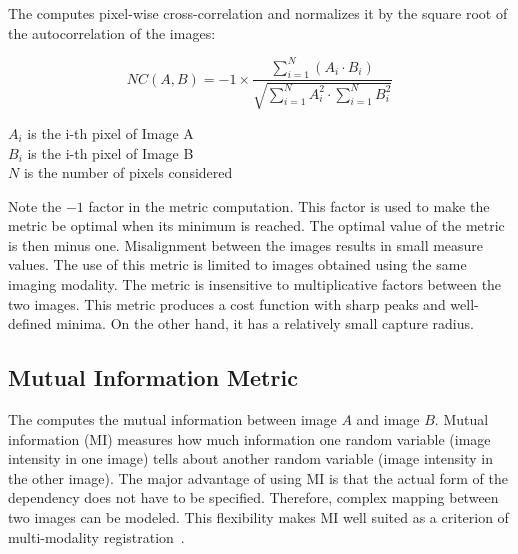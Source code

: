 The  computes pixel-wise
cross-correlation and normalizes it by the square root of the autocorrelation
of the images:

\begin{equation}
NC(A,B) = -1 \times \frac{ \sum_{i=1}^N \left( A_i \cdot B_i \right) }
        { \sqrt { \sum_{i=1}^N A_i^2  \cdot \sum_{i=1}^N B_i^2 } }
\end{equation}
\begin{center}
$A_i$ is the i-th pixel of Image A\\
$B_i$ is the i-th pixel of Image B\\
$N$ is the number of pixels considered
\end{center}

Note the $-1$ factor in the metric computation. This factor is used to make the
metric be optimal when its minimum is reached.  The optimal value of the metric
is then minus one. Misalignment between the images results in small measure
values.  The use of this metric is limited to images obtained using the same
imaging modality.  The metric is insensitive to multiplicative factors between
the two images.  This metric produces a cost function with sharp peaks and
well-defined minima.  On the other hand, it has a relatively small capture radius.


\subsection{Mutual Information Metric}
\label{sec:MutualInformationMetric}

The  computes the mutual
information between image $A$ and image $B$.  Mutual information (MI)
measures how much information one random variable (image intensity in one
image) tells about another random variable (image intensity in the other
image). The major advantage of using MI is that the actual form of the
dependency does not have to be specified.  Therefore, complex mapping between
two images can be modeled.  This flexibility makes MI well suited as a
criterion of multi-modality registration~\cite{Pluim2003}.

